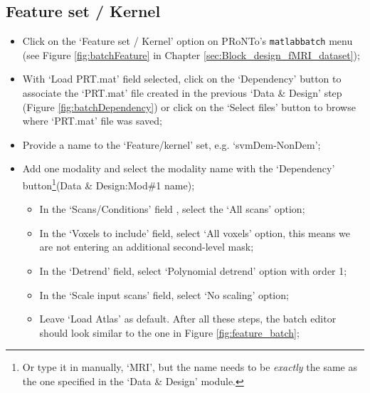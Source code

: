 
\subsection{Feature set / Kernel}

\begin{itemize}
	\item Click on the `Feature set / Kernel' option on PRoNTo's {\tt matlabbatch} menu (see Figure \ref{fig:batchFeature} in Chapter \ref{sec:Block_design_fMRI_dataset});
	
	\item With `Load PRT.mat' field selected, click on the `Dependency' button to associate the `PRT.mat' file created in the previous `Data \& Design' step (Figure \ref{fig:batchDependency}) or click on the `Select files' button to browse where `PRT.mat' file was saved;
	
	
    \item Provide a name to the `Feature/kernel' set, e.g. `svmDem-NonDem';
	
	\item Add one modality and select the modality name with the `Dependency' button\footnote{Or type it in manually, `MRI', but the name needs to be {\it exactly} the same as the one specified in the `Data \& Design' module.}(Data \& Design:Mod\#1 name);
	
		\begin{itemize}
	
	\item In the `Scans/Conditions' field , select the `All scans' option;
	
	\item In the `Voxels to include' field, select `All voxels' option, this means we are not entering an additional second-level mask;
	
	\item In the `Detrend' field, select `Polynomial detrend' option with order 1;
	
	\item In the `Scale input scans' field, select `No scaling' option;
	
	\item Leave `Load Atlas' as default. After all these steps, the batch editor should look similar to the one in Figure \ref{fig:feature_batch};
	

\end{itemize}
\end{itemize}
